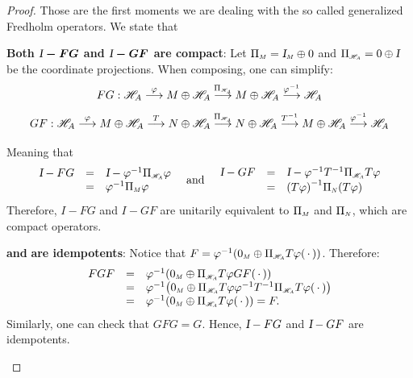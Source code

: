 \begin{teorema}
\begin{proof}
Those are the first moments we are dealing with the so called generalized Fredholm operators. We state that
\begin{itroman}
    \item \label{teo item: I-FG e I-GF sao compactos}\textbf{Both $\boldsymbol{\textsl{I} - FG}$ and $\boldsymbol{\textsl{I} - GF}$ are compact}: Let $\sub\Pi{M} = \sub\Id{M} \oplus 0$ and $\sub\Pi{\HA} = 0 \oplus \Id$ be the coordinate projections. When composing, one can simplify:
\begin{equation*}
    \begin{array}{c}
    FG: \HA \overset{\varphi}{\longto} M\oplus \HA \overset{\sub{\Pi}{\HA} }{\longto} M\oplus \HA \overset{\inv \varphi}{\longto} {\HA}
    \\
    \vphantom{\displaystyle\int\limits^b}GF: \HA \overset{\varphi}{\longto} M\oplus \HA \overset{T}{\longto} N\oplus \HA \overset{\sub\Pi{\HA}}{\longto} N \oplus \HA \overset{\inv T}{\longto} M\oplus \HA \overset{\inv \varphi}{\longto} {\HA}  
    \end{array}
\end{equation*}
Meaning that
\begin{equation*}
    \begin{array}{rcl}
        \Id - FG &=& \Id - \inv \varphi \sub\Pi{\HA}\varphi \\
        &=& \inv \varphi\sub\Pi M \varphi 
    \end{array}
\e 
\begin{array}{rcl}
     \Id - GF &=& \Id - \inv \varphi{\inv T} \sub\Pi{\HA} T\varphi  \\
     &=& \inv{(T\varphi)} \sub\Pi N(T\varphi)
\end{array}
    \end{equation*}
   Therefore, $I-FG$ and $I-GF$ are unitarily equivalent to $\sub\Pi M$ and $\sub \Pi N$, which are compact operators.
    
    \item {}  \textbf{and}  \textbf{are idempotents}: Notice that $F = \inv \varphi(\sub 0M \oplus \sub{\Pi}{\HA} T\varphi(\come))$. Therefore:
    \begin{equation*}
    \begin{array}{rcl}
         FGF &=& \inv \varphi(\sub 0M \oplus \sub{\Pi}{\HA} T\varphi GF(\come)) \\
         &=& \inv \varphi\big(\sub 0M \oplus \sub{\Pi}{\HA} T\varphi\inv \varphi\inv T \sub\Pi{\HA}T\varphi(\come)\big) \\
         &=&\inv \varphi(\sub 0M \oplus \sub{\Pi}{\HA} T\varphi(\come)) = F.
    \end{array}
    \end{equation*}
    Similarly, one can check that $GFG=G$. Hence, $\textsl{I}-FG$ and $\textsl{I} - GF$ are idempotents.


\end{itroman}
\end{proof}
\end{teorema}
